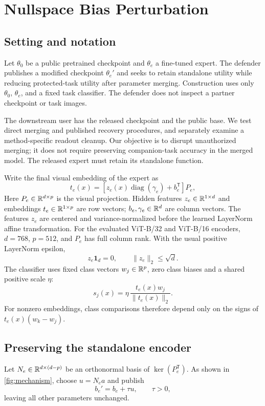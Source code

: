 \section{Nullspace Bias Perturbation}
\label{sec:method}
\subsection{Setting and notation}
Let $\theta_0$ be a public pretrained checkpoint and $\theta_e$ a fine-tuned expert. The defender publishes a modified checkpoint $\theta_e'$ and seeks to retain standalone utility while reducing protected-task utility after parameter merging. Construction uses only $\theta_0$, $\theta_e$, and a fixed task classifier. The defender does not inspect a partner checkpoint or task images.

The downstream user has the released checkpoint and the public base. We test direct merging and published recovery procedures, and separately examine a method-specific readout cleanup. Our objective is to disrupt unauthorized merging; it does not require preserving companion-task accuracy in the merged model. The released expert must retain its standalone function.

Write the final visual embedding of the expert as
\begin{equation}
 t_e(x)=[z_e(x)\operatorname{diag}(\gamma_e)+b_e^{\mathsf T}]P_e,
 \label{eq:embedding}
\end{equation}
Here $P_e\in\mathbb{R}^{d\times p}$ is the visual projection. Hidden features $z_e\in\mathbb{R}^{1\times d}$ and embeddings $t_e\in\mathbb{R}^{1\times p}$ are row vectors; $b_e,\gamma_e\in\mathbb{R}^d$ are column vectors. The features $z_e$ are centered and variance-normalized before the learned LayerNorm affine transformation. For the evaluated ViT-B/32 and ViT-B/16 encoders, $d=768$, $p=512$, and $P_e$ has full column rank. With the usual positive LayerNorm epsilon,
\begin{equation}
 z_e\mathbf{1}_d=0,\qquad \|z_e\|_2\leq\sqrt d.
 \label{eq:lnbound}
\end{equation}
The classifier uses fixed class vectors $w_j\in\mathbb{R}^p$, zero class biases and a shared positive scale $\eta$:
\begin{equation}
 s_j(x)=\eta\,\frac{t_e(x)w_j}{\|t_e(x)\|_2}.
 \label{eq:cosine}
\end{equation}
For nonzero embeddings, class comparisons therefore depend only on the signs of $t_e(x)(w_k-w_j)$.


\subsection{Preserving the standalone encoder}
Let $N_e\in\mathbb{R}^{d\times(d-p)}$ be an orthonormal basis of $\ker(P_e^{\mathsf T})$. As shown in \cref{fig:mechanism}, choose $u=N_ea$ and publish
\begin{equation}
 b_e'=b_e+\tau u,\qquad \tau>0,
 \label{eq:bias}
\end{equation}
leaving all other parameters unchanged.


